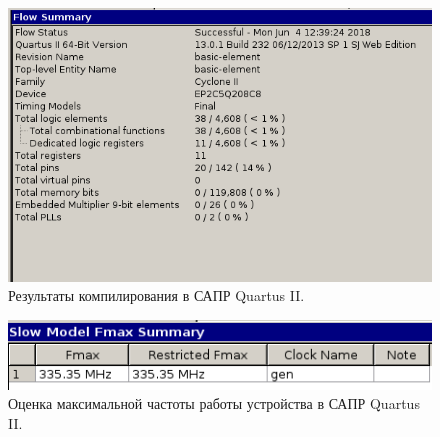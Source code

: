 \begin{figure}
  \begin{center}
    \includegraphics[scale=0.65]{./compile.png}
    \caption{Результаты компилирования в САПР Quartus II.}
    \label{fig:compile}
  \end{center}
\end{figure}

\begin{figure}
  \begin{center}
    \includegraphics[scale=0.65]{./freq.png}
    \caption{Оценка максимальной частоты работы устройства в САПР Quartus II.}
    \label{fig:freq}
  \end{center}
\end{figure}